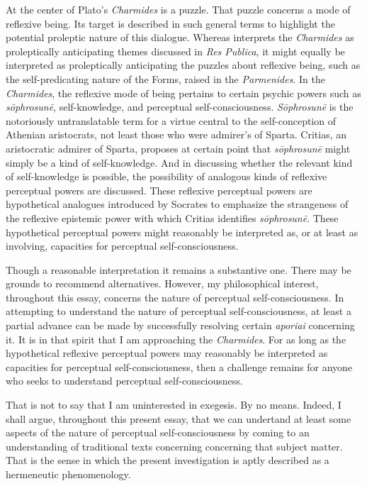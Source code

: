 At the center of Plato's \emph{Charmides} is a puzzle. That puzzle concerns a mode of reflexive being. Its target is described in such general terms to highlight the potential proleptic nature of this dialogue. Whereas \citet{Kahn:1988aa} interprets the \emph{Charmides} as proleptically anticipating themes discussed in \emph{Res Publica}, it might equally be interpreted as proleptically anticipating the puzzles about reflexive being, such as the self-predicating nature of the Forms, raised in the \emph{Parmenides}. In the \emph{Charmides}, the reflexive mode of being pertains to certain psychic powers such as \emph{sōphrosunē}, self-knowledge, and perceptual self-consciousness. \emph{Sōphrosunē} is the notoriously untranslatable term for a virtue central to the self-conception of Athenian aristocrats, not least those who were admirer's of Sparta. Critias, an aristocratic admirer of Sparta, proposes at certain point that \emph{sōphrosunē} might simply be a kind of self-knowledge. And in discussing whether the relevant kind of self-knowledge is possible, the possibility of analogous kinds of reflexive perceptual powers are discussed. These reflexive perceptual powers are hypothetical analogues introduced by Socrates to emphasize the strangeness of the reflexive epistemic power with which Critias identifies \emph{sōphrosunē}. These hypothetical perceptual powers might reasonably be interpreted as, or at least as involving, capacities for perceptual self-consciousness. 

Though a reasonable interpretation it remains a substantive one. There may be grounds to recommend alternatives. However, my philosophical interest, throughout this essay, concerns the nature of perceptual self-consciousness. In attempting to understand the nature of perceptual self-consciousness, at least a partial advance can be made by successfully resolving certain \emph{aporiai} concerning it. It is in that spirit that I am approaching the \emph{Charmides}. For as long as the hypothetical reflexive perceptual powers may reasonably be interpreted as capacities for perceptual self-consciousness, then a challenge remains for anyone who seeks to understand perceptual self-consciousness.

That is not to say that I am uninterested in exegesis. By no means. Indeed, I shall argue, throughout this present essay, that we can undertand at least some aspects of the nature of perceptual self-consciousness by coming to an understanding of traditional texts concerning concerning that subject matter. That is the sense in which the present investigation is aptly described as a hermeneutic phenomenology. 

